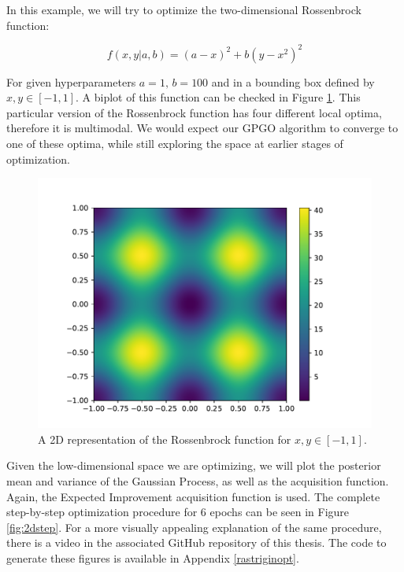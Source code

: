 \documentclass[10pt,a4paper,twoside]{book}
\begin{document}
In this example, we will try to optimize the two-dimensional Rossenbrock function:

\begin{equation}
f(x, y| a, b) = (a - x)^2 + b(y - x^2)^2
\end{equation}

For given hyperparameters $a=1,\, b=100$ and in a bounding box defined by $x,y \in [-1, 1]$. A biplot of this function can be checked in Figure \ref{fig:rosen}. This particular version of the Rossenbrock function has four different local optima, therefore it is multimodal. We would expect our GPGO algorithm to converge to one of these optima, while still exploring the space at earlier stages of optimization.\\

\begin{figure}
	\centering
	\caption{A 2D representation of the Rossenbrock function for $x, y \in [-1, 1]$.}
	\label{fig:rosen}
	\includegraphics[scale=0.5]{figures/chapter3/rosen/rosen}
\end{figure}

Given the low-dimensional space we are optimizing, we will plot the posterior mean and variance of the Gaussian Process, as well as the acquisition function. Again, the Expected Improvement acquisition function is used. The complete step-by-step optimization procedure for 6 epochs can be seen in Figure \ref{fig:2dstep}. For a more visually appealing explanation of the same procedure, there is a video in the associated GitHub repository of this thesis. The code to generate these figures is available in Appendix \ref{rastriginopt}.\\
\end{document}
